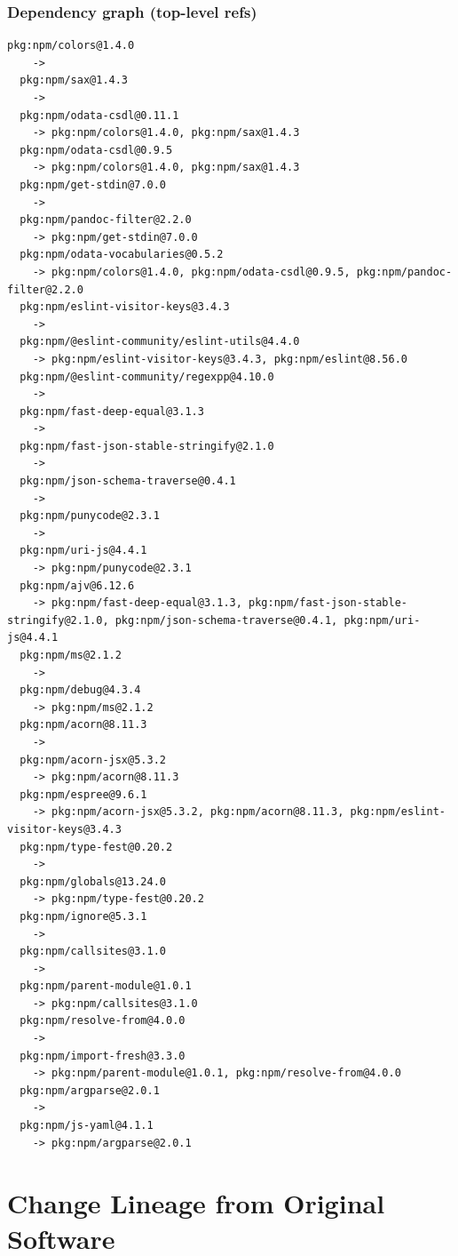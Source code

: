 \documentclass[11pt,a4paper]{article}
\begin{document}
\subsubsection*{Dependency graph (top-level refs)}
\begin{lstlisting}[style=depgraph]
  pkg:npm/colors@1.4.0
    -> 
  pkg:npm/sax@1.4.3
    -> 
  pkg:npm/odata-csdl@0.11.1
    -> pkg:npm/colors@1.4.0, pkg:npm/sax@1.4.3
  pkg:npm/odata-csdl@0.9.5
    -> pkg:npm/colors@1.4.0, pkg:npm/sax@1.4.3
  pkg:npm/get-stdin@7.0.0
    -> 
  pkg:npm/pandoc-filter@2.2.0
    -> pkg:npm/get-stdin@7.0.0
  pkg:npm/odata-vocabularies@0.5.2
    -> pkg:npm/colors@1.4.0, pkg:npm/odata-csdl@0.9.5, pkg:npm/pandoc-filter@2.2.0
  pkg:npm/eslint-visitor-keys@3.4.3
    -> 
  pkg:npm/@eslint-community/eslint-utils@4.4.0
    -> pkg:npm/eslint-visitor-keys@3.4.3, pkg:npm/eslint@8.56.0
  pkg:npm/@eslint-community/regexpp@4.10.0
    -> 
  pkg:npm/fast-deep-equal@3.1.3
    -> 
  pkg:npm/fast-json-stable-stringify@2.1.0
    -> 
  pkg:npm/json-schema-traverse@0.4.1
    -> 
  pkg:npm/punycode@2.3.1
    -> 
  pkg:npm/uri-js@4.4.1
    -> pkg:npm/punycode@2.3.1
  pkg:npm/ajv@6.12.6
    -> pkg:npm/fast-deep-equal@3.1.3, pkg:npm/fast-json-stable-stringify@2.1.0, pkg:npm/json-schema-traverse@0.4.1, pkg:npm/uri-js@4.4.1
  pkg:npm/ms@2.1.2
    -> 
  pkg:npm/debug@4.3.4
    -> pkg:npm/ms@2.1.2
  pkg:npm/acorn@8.11.3
    -> 
  pkg:npm/acorn-jsx@5.3.2
    -> pkg:npm/acorn@8.11.3
  pkg:npm/espree@9.6.1
    -> pkg:npm/acorn-jsx@5.3.2, pkg:npm/acorn@8.11.3, pkg:npm/eslint-visitor-keys@3.4.3
  pkg:npm/type-fest@0.20.2
    -> 
  pkg:npm/globals@13.24.0
    -> pkg:npm/type-fest@0.20.2
  pkg:npm/ignore@5.3.1
    -> 
  pkg:npm/callsites@3.1.0
    -> 
  pkg:npm/parent-module@1.0.1
    -> pkg:npm/callsites@3.1.0
  pkg:npm/resolve-from@4.0.0
    -> 
  pkg:npm/import-fresh@3.3.0
    -> pkg:npm/parent-module@1.0.1, pkg:npm/resolve-from@4.0.0
  pkg:npm/argparse@2.0.1
    -> 
  pkg:npm/js-yaml@4.1.1
    -> pkg:npm/argparse@2.0.1
\end{lstlisting}

\newpage
\section{Change Lineage from Original Software}
\end{document}
